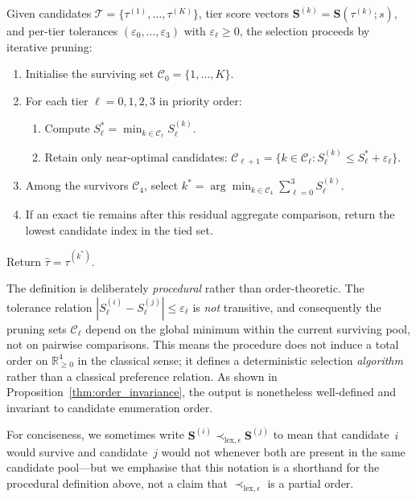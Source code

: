 \begin{definition}
\label{def:lex_selection}
Given candidates $\mathcal{T}=\{\tau^{(1)},\ldots,\tau^{(K)}\}$, tier score
vectors $\mathbf{S}^{(k)}=\mathbf{S}(\tau^{(k)};s)$, and per-tier
tolerances $(\varepsilon_0,\ldots,\varepsilon_3)$ with $\varepsilon_\ell\ge 0$,
the selection proceeds by iterative pruning:
\begin{enumerate}
\item Initialise the surviving set $\mathcal{C}_0 = \{1,\ldots,K\}$.
\item For each tier $\ell = 0,1,2,3$ in priority order:
  \begin{enumerate}
  \item Compute $S_\ell^* = \min_{k \in \mathcal{C}_\ell} S_\ell^{(k)}$.
  \item Retain only near-optimal candidates:
    $\mathcal{C}_{\ell+1} = \{k \in \mathcal{C}_\ell : S_\ell^{(k)} \le S_\ell^* + \varepsilon_\ell\}$.
  \end{enumerate}
\item Among the survivors $\mathcal{C}_4$, select
  $k^* = \arg\min_{k \in \mathcal{C}_4}\sum_{\ell=0}^{3} S_\ell^{(k)}$.
\item If an exact tie remains after this residual aggregate comparison, return the lowest candidate index in the tied set.
\end{enumerate}
Return $\hat{\tau} = \tau^{(k^*)}$.
\end{definition}

\noindent
The definition is deliberately \emph{procedural} rather than order-theoretic. The tolerance relation $|S_\ell^{(i)} - S_\ell^{(j)}| \le \varepsilon_\ell$ is \emph{not} transitive, and consequently the pruning sets $\mathcal{C}_\ell$ depend on the global minimum within the current surviving pool, not on pairwise comparisons.  This means the procedure does not induce a total order on $\mathbb{R}_{\ge 0}^4$ in the classical sense; it defines a deterministic selection \emph{algorithm} rather than a classical preference relation.  As shown in Proposition~\ref{thm:order_invariance}, the output is nonetheless well-defined and invariant to candidate enumeration order.

For conciseness, we sometimes write $\mathbf{S}^{(i)} \prec_{\text{lex},\epsilon} \mathbf{S}^{(j)}$ to mean that candidate~$i$ would survive and candidate~$j$ would not whenever both are present in the same candidate pool---but we emphasise that this notation is a shorthand for the procedural definition above, not a claim that $\prec_{\text{lex},\epsilon}$ is a partial order.

